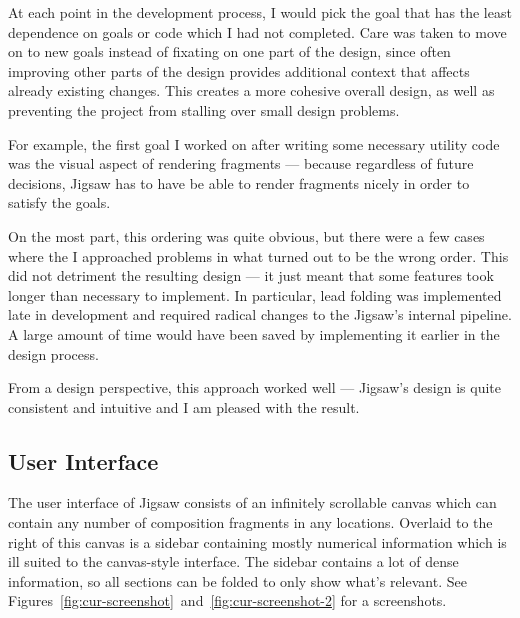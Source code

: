 \documentclass[12pt]{article}
\begin{document}
At each point in the development process, I would pick the goal that has the least dependence on
goals or code which I had not completed.  Care was taken to move on to new goals instead of fixating
on one part of the design, since often improving other parts of the design provides additional
context that affects already existing changes.  This creates a more cohesive overall design, as
well as preventing the project from stalling over small design problems.

For example, the first goal I worked on after writing some necessary utility code was the visual
aspect of rendering fragments --- because regardless of future decisions, Jigsaw has to have be able
to render fragments nicely in order to satisfy the goals.

On the most part, this ordering was quite obvious, but there were a few cases where the I approached
problems in what turned out to be the wrong order.  This did not detriment the resulting design ---
it just meant that some features took longer than necessary to implement.  In particular, lead
folding was implemented late in development and required radical changes to the Jigsaw's internal
pipeline.  A large amount of time would have been saved by implementing it earlier in the design
process.  

From a design perspective, this approach worked well --- Jigsaw's design is quite consistent and
intuitive and I am pleased with the result.

\subsection{User Interface}

The user interface of Jigsaw consists of an infinitely scrollable canvas which can contain any
number of composition fragments in any locations.  Overlaid to the right of this canvas is a sidebar
containing mostly numerical information which is ill suited to the canvas-style interface.  The
sidebar contains a lot of dense information, so all sections can be folded to only show what's
relevant.  See Figures~\ref{fig:cur-screenshot}~and~\ref{fig:cur-screenshot-2} for a screenshots.
\end{document}
